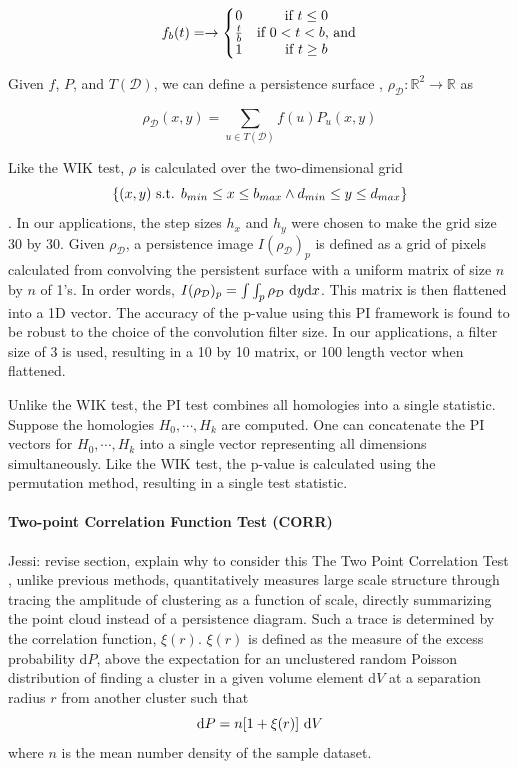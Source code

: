 \documentclass[12pt]{article}
\begin{document}
\[ f_{b}(t) = \rightarrow \left\{\begin{matrix}
0 & \textup{if } t \leq 0 \\
\frac{t}{b} & \textup{if } 0 < t < b\textup{, and}\\
1 & \textup{if } t \geq b
\end{matrix}\right. \]

Given $f$, $P$, and $T(\mathcal{D})$, we can define a persistence surface \citep{adams2015persistent}, $\rho_{\mathcal{D}} : \mathbb{R}^{2} \rightarrow \mathbb{R}$ as

\[ \rho_{\mathcal{D}}(x, y) = \sum_{u \in T(\mathcal{D})} f(u)P_{u}(x,y) \]

Like the WIK test, $\rho$ is calculated over the two-dimensional grid \[ \{ (x, y) \textup{ s.t. } b_{min} \leq x \leq b_{max} \wedge d_{min} \leq y \leq d_{max} \} \]. In our applications, the step sizes $h_{x}$ and $h_{y}$ were chosen to make the grid size 30 by 30. Given $\rho_{\mathcal{D}}$, a persistence image \citep{adams2015persistent} $I(\rho_{\mathcal{D}})_{p}$ is defined as a grid of pixels calculated from convolving the persistent surface with a uniform matrix of size $n$ by $n$ of 1's. In order words, $I(\rho_{\mathcal{D}})_{p} = \int\int_{p} \rho_{\mathcal{D}} \textup{ d}y\textup{d}x$. This matrix is then flattened into a 1D vector.  The accuracy of the p-value using this PI framework is found to be robust to the choice of the convolution filter size. In our applications, a filter size of 3 is used, resulting in a 10 by 10 matrix, or 100 length vector when flattened.

Unlike the WIK test, the PI test combines all homologies into a single statistic. Suppose the homologies $H_{0}, \cdots, H_{k}$ are computed. One can concatenate the PI vectors for $H_{0}, \cdots, H_{k}$ into a single vector representing all dimensions simultaneously. Like the WIK test, the p-value is calculated using the permutation method, resulting in a single test statistic.

\paragraph{Two-point Correlation Function Test (CORR)}
{\color{red}  Jessi:  revise section, explain why to consider this}
The Two Point Correlation Test \citep{landy1993bias}, unlike previous methods, quantitatively measures large scale structure through tracing the amplitude of clustering as a function of scale, directly summarizing the point cloud instead of a persistence diagram. Such a trace is determined by the correlation function, $\xi(r)$. $\xi(r)$ is defined as the measure of the excess probability d$P$, above the expectation for an unclustered random Poisson distribution of finding a cluster in a given volume element d$V$ at a separation radius $r$ from another cluster such that
\[ \textup{d}P = n[1 + \xi(r)] \textup{ d}V \] where $n$ is the mean number density of the sample dataset.
\end{document}
